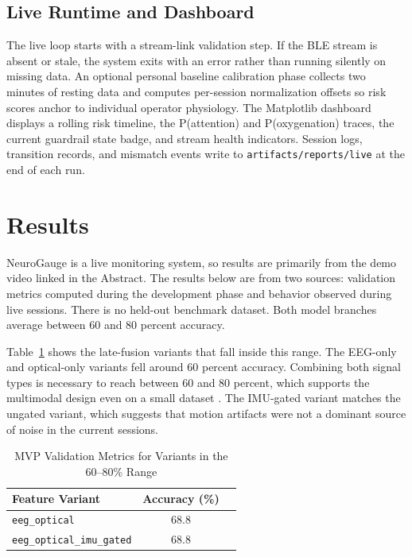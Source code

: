\documentclass[conference]{IEEEtran}
\begin{document}
\subsection{Live Runtime and Dashboard}

The live loop starts with a stream-link validation step. If the BLE stream is absent or stale, the system exits with an error rather than running silently on missing data. An optional personal baseline calibration phase collects two minutes of resting data and computes per-session normalization offsets so risk scores anchor to individual operator physiology. The Matplotlib dashboard displays a rolling risk timeline, the P(attention) and P(oxygenation) traces, the current guardrail state badge, and stream health indicators. Session logs, transition records, and mismatch events write to \texttt{artifacts/reports/live} at the end of each run.

\section{Results}

NeuroGauge is a live monitoring system, so results are primarily from the demo video linked in the Abstract. The results below are from two sources: validation metrics computed during the development phase and behavior observed during live sessions. There is no held-out benchmark dataset. Both model branches average between 60 and 80 percent accuracy.

Table~\ref{tab:mvp_validation} shows the late-fusion variants that fall inside this range. The EEG-only and optical-only variants fell around 60 percent accuracy. Combining both signal types is necessary to reach between 60 and 80 percent, which supports the multimodal design even on a small dataset \cite{b7}. The IMU-gated variant matches the ungated variant, which suggests that motion artifacts were not a dominant source of noise in the current sessions.

\begin{table}[htbp]
\caption{MVP Validation Metrics for Variants in the 60--80\% Range}
\centering
\begin{tabular}{lcc}
\toprule
\textbf{Feature Variant} & \textbf{Accuracy (\%)} \\
\midrule
\texttt{eeg\_optical}             & 68.8 \\
\texttt{eeg\_optical\_imu\_gated} & 68.8 \\
\bottomrule
\end{tabular}
\label{tab:mvp_validation}
\end{table}
\end{document}
